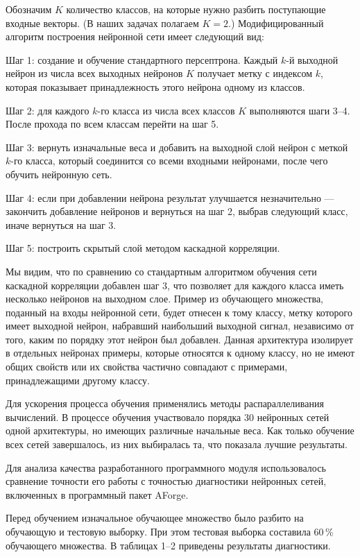 Обозначим $K$ количество классов, на которые нужно разбить поступающие входные векторы. (В наших задачах полагаем $K=2$.) Модифицированный алгоритм построения нейронной сети имеет следующий вид:

Шаг 1: создание и обучение стандартного персептрона. Каждый $k$-й выходной нейрон из числа всех выходных нейронов $K$ получает метку с индексом $k$, которая показывает принадлежность этого нейрона одному из классов.

Шаг 2: для каждого $k$-го класса из числа всех классов $K$ выполняются шаги 3--4. После прохода по всем классам перейти на шаг 5.

Шаг 3: вернуть изначальные веса и добавить на выходной слой нейрон с меткой $k$-го класса, который соединится со всеми входными нейронами, после чего обучить нейронную сеть.

Шаг 4: если при добавлении нейрона результат улучшается незначительно --- закончить добавление нейронов и вернуться на шаг 2, выбрав следующий класс, иначе вернуться на шаг 3.

Шаг 5: построить скрытый слой методом каскадной корреляции.

Мы видим, что по сравнению со стандартным алгоритмом обучения сети каскадной корреляции добавлен шаг 3, что позволяет для каждого класса иметь несколько нейронов на выходном слое. Пример из обучающего множества, поданный на входы нейронной сети, будет отнесен к тому классу, метку которого имеет выходной нейрон, набравший наибольший выходной сигнал, независимо от того, каким по порядку этот нейрон был добавлен. Данная архитектура  изолирует в отдельных нейронах примеры, которые относятся к одному классу, но не имеют общих свойств или их свойства частично совпадают с примерами, принадлежащими другому классу.

Для ускорения процесса обучения применялись методы распараллеливания вычислений. В процессе обучения участвовало порядка 30 нейронных сетей одной архитектуры, но имеющих различные начальные веса. Как только обучение всех сетей завершалось, из них выбиралась та, что показала лучшие результаты.

Для анализа качества разработанного программного модуля использовалось сравнение точности его работы с точностью диагностики нейронных сетей, включенных в программный пакет AForge.

Перед обучением изначальное обучающее множество было разбито на обучающую и тестовую выборку. При этом тестовая выборка составила 60\,\% обучающего множества. В таблицах 1--2 приведены результаты диагностики.

